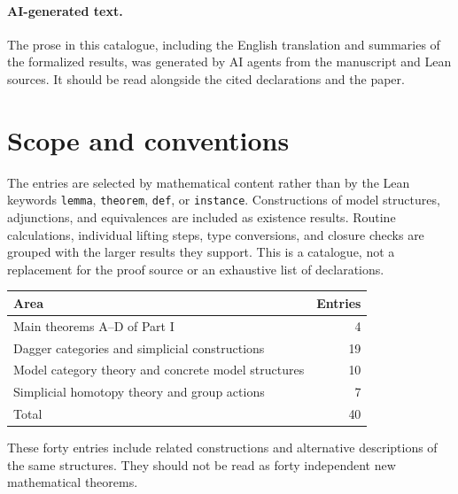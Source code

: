 \begin{abstract}
This companion records a selection of substantial results in the Lean 4 formalization accompanying \emph{Models for dagger $(\infty,1)$-categories I: Dagger simplicial sets and unitary cores}.
It includes the four main theorems of Part I and supporting results in dagger category theory, model category theory, simplicial homotopy theory, and equivariant constructions.
Each entry gives a mathematical statement, the corresponding Lean declarations, source locations, and a brief account of the construction or reused infrastructure.
The formalization was developed with AI assistance.
\end{abstract}

\paragraph{AI-generated text.}
The prose in this catalogue, including the English translation and summaries of the formalized results, was generated by AI agents from the manuscript and Lean sources.
It should be read alongside the cited declarations and the paper.

\section*{Scope and conventions}
The entries are selected by mathematical content rather than by the Lean keywords \texttt{lemma}, \texttt{theorem}, \texttt{def}, or \texttt{instance}.
Constructions of model structures, adjunctions, and equivalences are included as existence results.
Routine calculations, individual lifting steps, type conversions, and closure checks are grouped with the larger results they support.
This is a catalogue, not a replacement for the proof source or an exhaustive list of declarations.

\begin{center}
\begin{tabular}{lr}
\toprule
Area & Entries\\
\midrule
Main theorems A--D of Part I & 4\\
Dagger categories and simplicial constructions & 19\\
Model category theory and concrete model structures & 10\\
Simplicial homotopy theory and group actions & 7\\
\midrule
Total & 40\\
\bottomrule
\end{tabular}
\end{center}
These forty entries include related constructions and alternative descriptions of the same structures.
They should not be read as forty independent new mathematical theorems.

